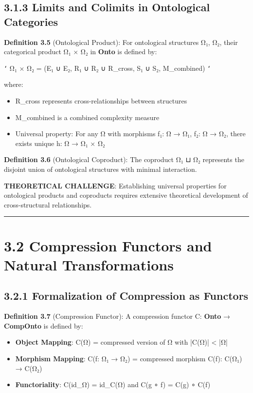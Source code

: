 \subsection{3.1.3 Limits and Colimits in Ontological Categories}

\textbf{Definition 3.5} (Ontological Product): For ontological structures Ω₁, Ω₂, their categorical product Ω₁ × Ω₂ in \textbf{Onto} is defined by:

\texttt{`}
Ω₁ × Ω₂ = (E₁ ∪ E₂, R₁ ∪ R₂ ∪ R_cross, S₁ ∪ S₂, M_combined)
\texttt{`}

where:
\begin{itemize}
\item R_cross represents cross-relationships between structures
\item M_combined is a combined complexity measure
\item Universal property: For any Ω with morphisms f₁: Ω → Ω₁, f₂: Ω → Ω₂, there exists unique h: Ω → Ω₁ × Ω₂
\end{itemize}

\textbf{Definition 3.6} (Ontological Coproduct): The coproduct Ω₁ ⊔ Ω₂ represents the disjoint union of ontological structures with minimal interaction.

\textbf{THEORETICAL CHALLENGE}: Establishing universal properties for ontological products and coproducts requires extensive theoretical development of cross-structural relationships.

\hrule

\section{3.2 Compression Functors and Natural Transformations}

\subsection{3.2.1 Formalization of Compression as Functors}

\textbf{Definition 3.7} (Compression Functor): A compression functor C: \textbf{Onto} → \textbf{CompOnto} is defined by:

\begin{itemize}
\item \textbf{Object Mapping}: C(Ω) = compressed version of Ω with |C(Ω)| < |Ω|
\item \textbf{Morphism Mapping}: C(f: Ω₁ → Ω₂) = compressed morphism C(f): C(Ω₁) → C(Ω₂)
\item \textbf{Functoriality}: C(id_Ω) = id_{C(Ω)} and C(g ∘ f) = C(g) ∘ C(f)
\end{itemize}

